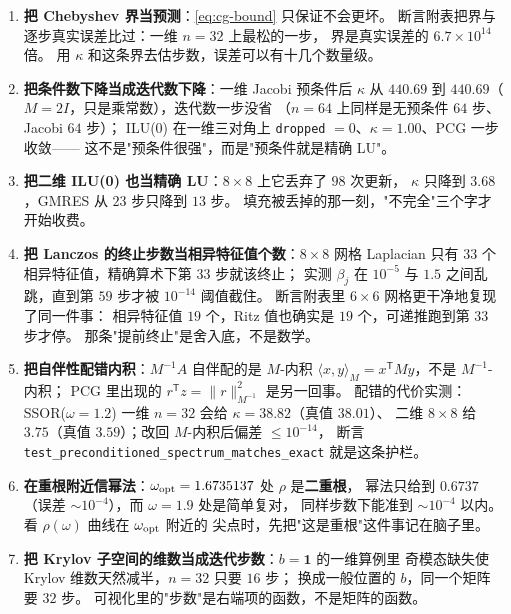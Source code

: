 \begin{enumerate}
        CG 是 $0.957$、GMRES 是 $0.000$——GMRES 的最小残差性质让它在第一步就不可能回升。
        看 CG 用 A-范数误差，看 GMRES 才用残差。
  \item \textbf{把 Chebyshev 界当预测}：\eqref{eq:cg-bound} 只保证不会更坏。
        断言附表把界与逐步真实误差比过：一维 $n=32$ 上最松的一步，
        界是真实误差的 $6.7\times10^{14}$ 倍。
        用 $\kappa$ 和这条界去估步数，误差可以有十几个数量级。
  \item \textbf{把条件数下降当成迭代数下降}：一维 Jacobi 预条件后
        $\kappa$ 从 $440.69$ 到 $440.69$（$M=2I$，只是乘常数），迭代数一步没省
        （$n=64$ 上同样是无预条件 $64$ 步、Jacobi $64$ 步）；
        ILU(0) 在一维三对角上 \texttt{dropped} $=0$、$\kappa=1.00$、PCG 一步收敛——
        这不是"预条件很强"，而是"预条件就是精确 LU"。
  \item \textbf{把二维 ILU(0) 也当精确 LU}：$8\times8$ 上它丢弃了 $98$ 次更新，
        $\kappa$ 只降到 $3.68$，GMRES 从 $23$ 步只降到 $13$ 步。
        填充被丢掉的那一刻，"不完全"三个字才开始收费。
  \item \textbf{把 Lanczos 的终止步数当相异特征值个数}：$8\times8$ 网格 Laplacian
        只有 $33$ 个相异特征值，精确算术下第 $33$ 步就该终止；
        实测 $\beta_j$ 在 $10^{-5}$ 与 $1.5$ 之间乱跳，直到第 $59$ 步才被 $10^{-14}$ 阈值截住。
        断言附表里 $6\times6$ 网格更干净地复现了同一件事：
        相异特征值 $19$ 个，Ritz 值也确实是 $19$ 个，可递推跑到第 $33$ 步才停。
        那条"提前终止"是舍入底，不是数学。
  \item \textbf{把自伴性配错内积}：$M^{-1}A$ 自伴配的是 $M$-内积
        $\langle x,y\rangle_M=x^{\mathsf T}My$，不是 $M^{-1}$-内积；
        PCG 里出现的 $r^{\mathsf T}z=\|r\|_{M^{-1}}^2$ 是另一回事。
        配错的代价实测：SSOR($\omega=1.2$) 一维 $n=32$ 会给 $\kappa=38.82$（真值 $38.01$）、
        二维 $8\times8$ 给 $3.75$（真值 $3.59$）；改回 $M$-内积后偏差 $\le10^{-14}$，
        断言 \texttt{test\_preconditioned\_spectrum\_matches\_exact} 就是这条护栏。
  \item \textbf{在重根附近信幂法}：$\omega_{\rm opt}=1.6735137$ 处 $\rho$ 是\textbf{二重根}，
        幂法只给到 $0.6737$（误差 $\sim10^{-4}$），而 $\omega=1.9$ 处是简单复对，
        同样步数下能准到 $\sim10^{-4}$ 以内。看 $\rho(\omega)$ 曲线在 $\omega_{\rm opt}$ 附近的
        尖点时，先把"这是重根"这件事记在脑子里。
  \item \textbf{把 Krylov 子空间的维数当成迭代步数}：$b=\mathbf 1$ 的一维算例里
        奇模态缺失使 Krylov 维数天然减半，$n=32$ 只要 $16$ 步；
        换成一般位置的 $b$，同一个矩阵要 $32$ 步。
        可视化里的"步数"是右端项的函数，不是矩阵的函数。
\end{enumerate}
